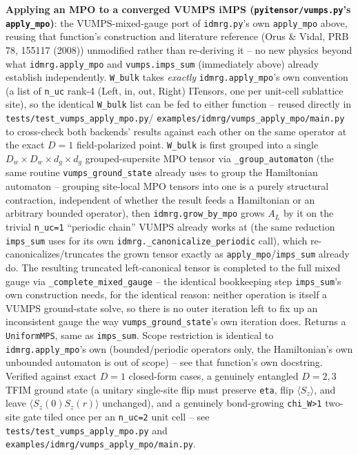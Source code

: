 \documentclass[11pt]{article}
\begin{document}
\textbf{Applying an MPO to a converged VUMPS iMPS
(\texttt{pyitensor/vumps.py}'s \texttt{apply\_mpo})}: the VUMPS-mixed-gauge
port of \texttt{idmrg.py}'s own \texttt{apply\_mpo} above, reusing that
function's construction and literature reference (Orus \& Vidal, PRB 78,
155117 (2008)) unmodified rather than re-deriving it -- no new physics
beyond what \texttt{idmrg.apply\_mpo} and \texttt{vumps.imps\_sum}
(immediately above) already establish independently. \texttt{W\_bulk}
takes \emph{exactly} \texttt{idmrg.apply\_mpo}'s own convention (a list of
\texttt{n\_uc} rank-4 (Left, in, out, Right) ITensors, one per unit-cell
sublattice site), so the identical \texttt{W\_bulk} list can be fed to
either function -- reused directly in
\texttt{tests/test\_vumps\_apply\_mpo.py}/
\texttt{examples/idmrg/vumps\_apply\_mpo/main.py} to cross-check both
backends' results against each other on the same operator at the exact
$D=1$ field-polarized point. \texttt{W\_bulk} is first grouped into a
single $D_w \times D_w \times d_g \times d_g$ grouped-supersite MPO tensor
via \texttt{\_group\_automaton} (the same routine
\texttt{vumps\_ground\_state} already uses to group the Hamiltonian
automaton -- grouping site-local MPO tensors into one is a purely
structural contraction, independent of whether the result feeds a
Hamiltonian or an arbitrary bounded operator), then
\texttt{idmrg.grow\_by\_mpo} grows $A_L$ by it on the trivial
\texttt{n\_uc=1} ``periodic chain'' VUMPS already works at (the same
reduction \texttt{imps\_sum} uses for its own
\texttt{idmrg.\_canonicalize\_periodic} call), which
re-canonicalizes/truncates the grown tensor exactly as
\texttt{apply\_mpo}/\texttt{imps\_sum} already do. The resulting truncated
left-canonical tensor is completed to the full mixed gauge via
\texttt{\_complete\_mixed\_gauge} -- the identical bookkeeping step
\texttt{imps\_sum}'s own construction needs, for the identical reason:
neither operation is itself a VUMPS ground-state solve, so there is no
outer iteration left to fix up an inconsistent gauge the way
\texttt{vumps\_ground\_state}'s own iteration does. Returns a
\texttt{UniformMPS}, same as \texttt{imps\_sum}. Scope restriction is
identical to \texttt{idmrg.apply\_mpo}'s own (bounded/periodic operators
only, the Hamiltonian's own unbounded automaton is out of scope) -- see
that function's own docstring. Verified against exact $D=1$ closed-form
cases, a genuinely entangled $D=2,3$ TFIM ground state (a unitary
single-site flip must preserve \texttt{eta}, flip $\langle S_z\rangle$,
and leave $\langle S_z(0)S_z(r)\rangle$ unchanged), and a genuinely
bond-growing \texttt{chi\_W>1} two-site gate tiled once per an
\texttt{n\_uc=2} unit cell -- see \texttt{tests/test\_vumps\_apply\_mpo.py}
and \texttt{examples/idmrg/vumps\_apply\_mpo/main.py}.
\end{document}
